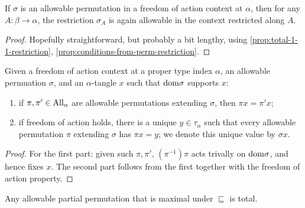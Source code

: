\begin{proposition}
  \label{prop:restrict-allowable-partial-perm}
  \leanok
  If $\sigma$ is an allowable permutation in a freedom of action context at $\alpha$, then for any $A : \beta \to \alpha$, the restriction $\sigma_A$ is again allowable in the context restricted along $A$.
\end{proposition}

\begin{proof}
  Hopefully straightforward, but probably a bit lengthy, using \cref{prop:total-1-1-restriction}, \cref{prop:conditions-from-perm-restriction}.
\end{proof}

\begin{proposition}
  \label{prop:allowable-partial-perm-action}
  \leanok
  Given a freedom of action context at a proper type index $\alpha$, an allowable permuation $\sigma$, and an $\alpha$-tangle $x$ such that $\mathrm{dom} \sigma$ supports $x$:
  \begin{enumerate}
    \item if $\pi, \pi' \in \mathrm{All}_\alpha$ are allowable permutations extending $\sigma$, then $\pi x = \pi' x$;
    \item if freedom of action holds, there is a unique $y \in \tau_\alpha$ such that every allowable permutation $\pi$ extending $\sigma$ has $\pi x = y$; we denote this unique value by $\sigma x$.
  \end{enumerate}
\end{proposition}

\begin{proof}
  For the first part: given such $\pi, \pi'$, $(\pi^{-1})\pi$ acts trivally on $\mathrm{dom} \sigma$, and hence fixes $x$.  The second part follows from the first together with the freedom of action property.
\end{proof}

\begin{lemma}
  \label{lem:maximal-allowable-partial-perm-total}
  \leanok
  Any allowable partial permutation that is maximal under $\sqsubseteq$ is total.
\end{lemma}

